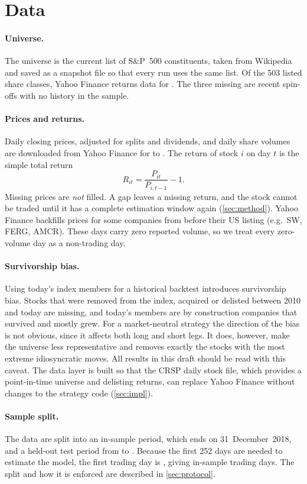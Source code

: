 \section{Data}
\label{sec:data}

\paragraph{Universe.}
The universe is the current list of S\&P~500 constituents, taken from Wikipedia and saved as a
snapshot file so that every run uses the same list. Of the 503 listed share classes, Yahoo
Finance returns data for \NStocksTotal{}. The three missing are recent spin-offs with no
history in the sample.

\paragraph{Prices and returns.}
Daily closing prices, adjusted for splits and dividends, and daily share volumes are downloaded
from Yahoo Finance for \DataStart{} to \DataEnd{}. The return of stock $i$ on day $t$ is the
simple total return
\begin{equation}
  R_{it} = \frac{P_{it}}{P_{i,t-1}} - 1 .
\end{equation}
Missing prices are \emph{not} filled. A gap leaves a missing return, and the stock cannot be
traded until it has a complete estimation window again (\cref{sec:method}). Yahoo Finance
backfills prices for some companies from before their US listing (e.g.\ SW, FERG, AMCR). These
days carry zero reported volume, so we treat every zero-volume day as a non-trading day.

\paragraph{Survivorship bias.}
Using today's index members for a historical backtest introduces survivorship bias. Stocks that
were removed from the index, acquired or delisted between 2010 and today are missing, and
today's members are by construction companies that survived and mostly grew. For a
market-neutral strategy the direction of the bias is not obvious, since it affects both long and
short legs. It does, however, make the universe less representative and removes exactly the
stocks with the most extreme idiosyncratic moves. All results in this draft should be read with
this caveat. The data layer is built so that the CRSP daily stock file, which provides a
point-in-time universe and delisting returns, can replace Yahoo Finance without changes to the
strategy code (\cref{sec:impl}).

\paragraph{Sample split.}
The data are split into an in-sample period, which ends on 31~December~2018, and a held-out test
period from \SplitDate{} to \DataEnd{}. Because the first 252 days are needed to estimate the
model, the first trading day is \InSampleStart{}, giving \InSampleDays{} in-sample trading
days. The split and how it is enforced are described in \cref{sec:protocol}.
